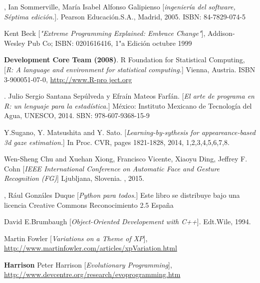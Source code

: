 \documentclass[12pt]{book} %
\begin{document}
\begin{thebibliography}{99} %

\small
{},
Ian Sommerville, María Isabel Alfonso Galipienso
[\textit{ingeniería del software, Séptima edición.}]. 
Pearson Educación.S.A., Madrid, 2005. ISBN: 84-7829-074-5

Kent Beck 
[\textit{"Extreme Programming Explained: Embrace Change"}],
Addison-Wesley Pub Co; ISBN: 0201616416, 1"a Edición octubre 1999

 {\textbf{Development Core Team (2008)}}. 
R Foundation for Statistical Computing, 
[\textit{R: A language and environment for statistical computing.}]
Vienna, Austria. ISBN 3-900051-07-0, \href{http://www.R-pro ject.org}{http://www.R-pro ject.org}

.
Julio Sergio Santana Sepúlveda y Efraín Mateos Farfán.
[\textit{El arte de programa en R: un lenguaje para la estadística.}]
México: Instituto Mexicano de Tecnología del Agua, UNESCO, 2014. SBN: 978-607-9368-15-9

Y.Sugano, Y. Matsushita and Y. Sato.
[\textit{Learning-by-sythesis for appeareance-based 3d gaze estimation.}]
In Proc. CVR, pages 1821-1828, 2014, 1,2,3,4,5,6,7,8.

Wen-Sheng Chu and Xuehan Xiong, Francisco Vicente, Xiaoyu Ding, Jeffrey F. Cohn
[\textit{IEEE International Conference on Automatic Face and Gesture Recognition (FG)}]
Ljubljana, Slovenia. , 2015.

,
Rául Gonzáles Duque
[\textit{Python para todos.}]
Este libro se distribuye bajo una licencia Creative Commons Reconocimiento 2.5 España

David E.Brumbaugh
[\textit{Object-Oriented Developement with C++}]. 
Edt.Wile, 1994.


Martin Fowler 
[\textit{Variations on a Theme of XP}], 
\href{http://www.martinfowler.com/articles/xpVariation.html}{http://www.martinfowler.com/articles/xpVariation.html}

 {\textbf{Harrison}}
Peter Harrison 
[\textit {Evolutionary Programming}],
\href{http://www.devcentre.org/research/evoprogramming.htm}{http://www.devcentre.org/research/evoprogramming.htm}


\end{thebibliography}


 
\end{document}
